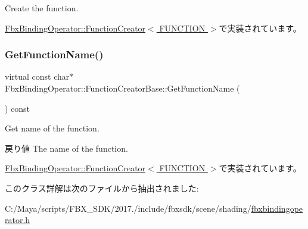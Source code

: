 Create the function. 

\hyperlink{class_fbx_binding_operator_1_1_function_creator_a0d7fd7fb26969b0b2a46b6a44e6e2ac8}{Fbx\+Binding\+Operator\+::\+Function\+Creator$<$ F\+U\+N\+C\+T\+I\+O\+N $>$}で実装されています。

\mbox{\label{class_fbx_binding_operator_1_1_function_creator_base_a7a5ec0f9c376ce88b12cbfe171498913}} 
\subsubsection{\texorpdfstring{Get\+Function\+Name()}{GetFunctionName()}}
{\footnotesize\ttfamily virtual const char$\ast$ Fbx\+Binding\+Operator\+::\+Function\+Creator\+Base\+::\+Get\+Function\+Name (\begin{DoxyParamCaption}{ }\end{DoxyParamCaption}) const\hspace{0.3cm}{\ttfamily [pure virtual]}}

Get name of the function. \begin{DoxyReturn}{戻り値}
The name of the function. 
\end{DoxyReturn}


\hyperlink{class_fbx_binding_operator_1_1_function_creator_ae54e4bf8030e91bcd1b6fe5e9126be9d}{Fbx\+Binding\+Operator\+::\+Function\+Creator$<$ F\+U\+N\+C\+T\+I\+O\+N $>$}で実装されています。



このクラス詳解は次のファイルから抽出されました\+:\begin{DoxyCompactItemize}
\item 
C\+:/\+Maya/scripts/\+F\+B\+X\+\_\+\+S\+D\+K/2017./include/fbxsdk/scene/shading/\hyperlink{fbxbindingoperator_8h}{fbxbindingoperator.\+h}\end{DoxyCompactItemize}
